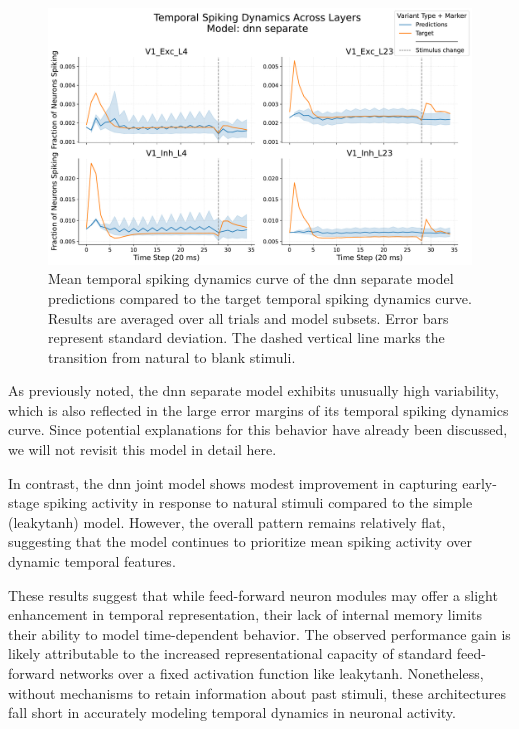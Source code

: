 \begin{figure}
    \centering
    \includegraphics[width=\linewidth]{img/plots/separate_model_synchrony_curve_dnn_separate_evaluation.pdf}
    \caption{Mean temporal spiking dynamics curve of the dnn separate model predictions compared to the target temporal spiking dynamics curve. Results are averaged over all trials and model subsets. Error bars represent standard deviation. The dashed vertical line marks the transition from natural to blank stimuli.}
    \label{fig:synchrony_curve_dnn_separate}
\end{figure}

As previously noted, the dnn separate model exhibits unusually high variability, which is also reflected in the large error margins of its temporal spiking dynamics curve. Since potential explanations for this behavior have already been discussed, we will not revisit this model in detail here.

In contrast, the dnn joint model shows modest improvement in capturing early-stage spiking activity in response to natural stimuli compared to the simple (leakytanh) model. However, the overall pattern remains relatively flat, suggesting that the model continues to prioritize mean spiking activity over dynamic temporal features.

These results suggest that while feed-forward neuron modules may offer a slight enhancement in temporal representation, their lack of internal memory limits their ability to model time-dependent behavior. The observed performance gain is likely attributable to the increased representational capacity of standard feed-forward networks over a fixed activation function like leakytanh. Nonetheless, without mechanisms to retain information about past stimuli, these architectures fall short in accurately modeling temporal dynamics in neuronal activity.


